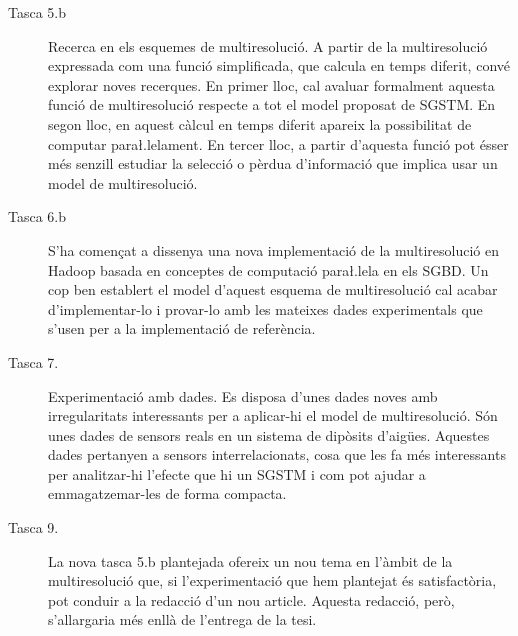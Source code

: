 \begin{description}


\item[Tasca 5.b] Recerca en els esquemes de multiresolució.  A partir
  de la multiresolució expressada com una funció simplificada, que
  calcula en temps diferit, convé explorar noves recerques. En primer
  lloc, cal avaluar formalment aquesta funció de multiresolució
  respecte a tot el model proposat de SGSTM. En segon lloc, en aquest
  càlcul en temps diferit apareix la possibilitat de computar
  para\l.lelament. En tercer lloc, a partir d'aquesta funció pot ésser
  més senzill estudiar la selecció o pèrdua d'informació que implica
  usar un model de multiresolució.


\item[Tasca 6.b] S'ha començat a dissenya una nova implementació de la
  multiresolució en Hadoop basada en conceptes de computació
  para\l.lela en els SGBD. Un cop ben establert el model d'aquest
  esquema de multiresolució cal acabar d'implementar-lo i provar-lo
  amb les mateixes dades experimentals que s'usen per a la
  implementació de referència.


\item[Tasca 7.] Experimentació amb dades. Es disposa d'unes dades
  noves amb irregularitats interessants per a aplicar-hi el model de
  multiresolució. Són unes dades de sensors reals en un sistema de
  dipòsits d'aigües. Aquestes dades pertanyen a sensors
  interrelacionats, cosa que les fa més interessants per analitzar-hi
  l'efecte que hi un SGSTM i com pot ajudar a emmagatzemar-les de
  forma compacta.


\item[Tasca 9.] La nova tasca 5.b plantejada ofereix un nou tema en
  l'àmbit de la multiresolució que, si l'experimentació que hem
  plantejat és satisfactòria, pot conduir a la redacció d'un nou
  article. Aquesta redacció, però, s'allargaria més enllà de l'entrega
  de la tesi.

\end{description}


